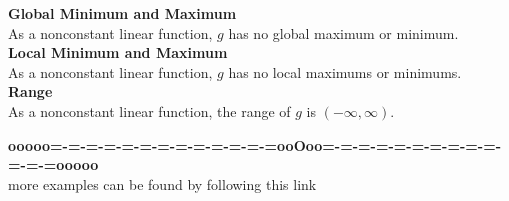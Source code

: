 \documentclass{ximera}
\begin{document}
\begin{example}
\textbf{Global Minimum and Maximum} \\

As a nonconstant linear function, $g$ has no global maximum or minimum. \\



\textbf{Local Minimum and Maximum} \\

As a nonconstant linear function, $g$ has no local maximums or minimums. \\



\textbf{Range} \\

As a nonconstant linear function, the range of $g$ is $(-\infty, \infty)$. \\



\end{example}




\begin{center}
\textbf{\textcolor{green!50!black}{ooooo=-=-=-=-=-=-=-=-=-=-=-=-=ooOoo=-=-=-=-=-=-=-=-=-=-=-=-=ooooo}} \\

more examples can be found by following this link\\ 

\end{center}
\end{document}

